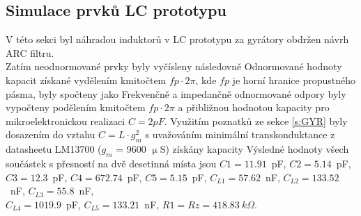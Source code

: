 \subsection{Simulace prvků LC prototypu}\label{s:ARC}
V této sekci byl náhradou induktorů v LC prototypu za gyrátory obdržen návrh ARC filtru.\\
Zatím neodnormované prvky byly vyčísleny následovně
\noindent Odnormované hodnoty kapacit získané vydělením kmitočtem $fp \cdot 2 \pi$, kde $fp$ je horní hranice propustného pásma, byly spočteny jako
\noindent Frekvenčně a impedančně odnormované odpory byly vypočteny podělením kmitočtem $fp \cdot 2 \pi$ a přibližnou hodnotou kapacity pro mikroelektronickou realizaci $C = 2 pF$.
\noindent Využitím poznatků ze sekce \ref{s:GYR} byly dosazením do vztahu $C = L \cdot g_m^2$ s uvažováním minimální transkonduktance z datasheetu LM13700 ($g_m$ = 9600 $\upmu$S) získány kapacity 
\noindent Výsledné hodnoty všech součástek s přesností na dvě desetinná místa jsou $C1 = 11.91$~pF, $C2 = 5.14$~pF, \\$C3 = 12.3$~pF, $C4 = 672.74$~pF, $C5 = 5.15$~pF, $C_{L1} = 57.62$~nF, $C_{L2} = 133.52$~nF, $C_{L3} = 55.8$~nF, \\$C_{L4} = 1019.9$~pF, $C_{L5} = 133.21$~nF, $R1 = Rz = 418.83\ k\Omega$.
